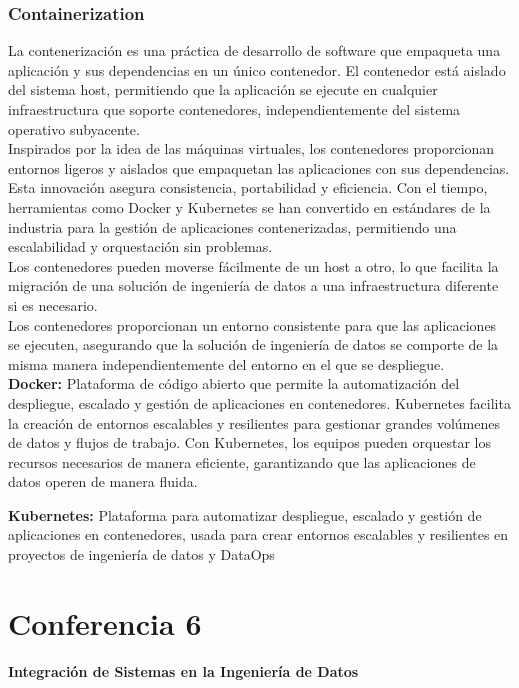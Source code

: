 \documentclass[12pt]{book}
\begin{document}
\subsection{Containerization}

La contenerización es una práctica de desarrollo de software que empaqueta una aplicación y sus dependencias en un único contenedor. El contenedor está aislado del sistema host, permitiendo que la aplicación se ejecute en cualquier infraestructura que soporte contenedores, independientemente del sistema operativo subyacente.\\
Inspirados por la idea de las máquinas virtuales, los contenedores proporcionan entornos ligeros y aislados que empaquetan las aplicaciones con sus dependencias. Esta innovación asegura consistencia, portabilidad y eficiencia. Con el tiempo, herramientas como Docker y Kubernetes se han convertido en estándares de la industria para la gestión de aplicaciones contenerizadas, permitiendo una escalabilidad y orquestación sin problemas.\\
Los contenedores pueden moverse fácilmente de un host a otro, lo que facilita la migración de una solución de ingeniería de datos a una infraestructura diferente si es necesario.\\
Los contenedores proporcionan un entorno consistente para que las aplicaciones se ejecuten, asegurando que la solución de ingeniería de datos se comporte de la misma manera independientemente del entorno en el que se despliegue.\\

\textbf{Docker:} Plataforma de código abierto que permite la automatización del despliegue, escalado y gestión de aplicaciones en contenedores. Kubernetes facilita la creación de entornos escalables y resilientes para gestionar grandes volúmenes de datos y flujos de trabajo. Con Kubernetes, los equipos pueden orquestar los recursos necesarios de manera eficiente, garantizando que las aplicaciones de datos operen de manera fluida.

\textbf{Kubernetes:} Plataforma para automatizar despliegue, escalado y gestión de aplicaciones en contenedores, usada para crear entornos escalables y resilientes en proyectos de ingeniería de datos y DataOps

\chapter{Conferencia 6}
\normalfont\LARGE \textbf{Integración de Sistemas en la Ingeniería de Datos}
\normalfont\small\\
\end{document}
